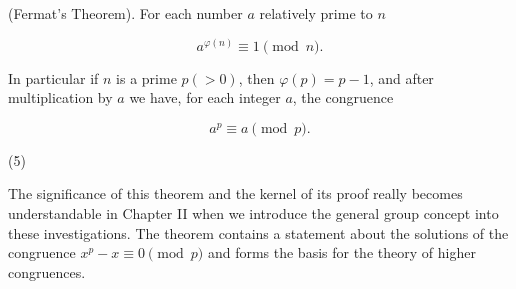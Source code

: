 (Fermat’s Theorem). For each number $a$ relatively prime to $n$

$$a^{\varphi(n)} \equiv 1 \pmod{n}.$$

In particular if $n$ is a prime $p (>0)$, then $\varphi(p) = p - 1$, and after multiplication by $a$ we have, for each integer $a$, the congruence

$$a^p \equiv a \pmod{p}.$$

(5)

The significance of this theorem and the kernel of its proof really becomes understandable in Chapter II when we introduce the general group concept into these investigations. The theorem contains a statement about the solutions of the congruence $x^p - x \equiv 0 \pmod{p}$ and forms the basis for the theory of higher congruences.
